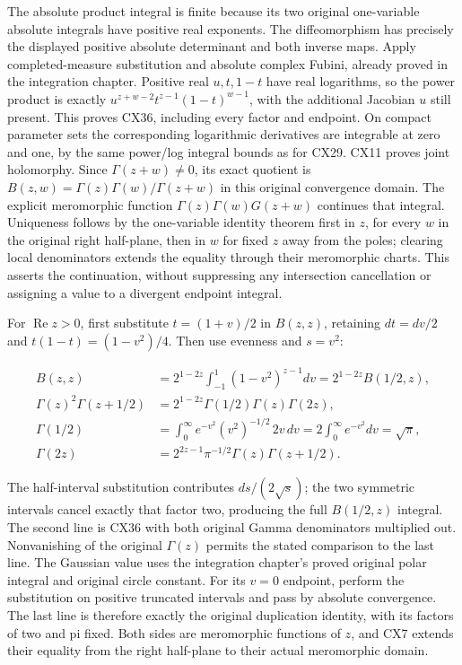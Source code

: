 \documentclass[
  11pt,
]{article}
\begin{document}
The absolute product integral is finite because its two original
one-variable absolute integrals have positive real exponents. The
diffeomorphism has precisely the displayed positive absolute determinant
and both inverse maps. Apply completed-measure substitution and absolute
complex Fubini, already proved in the integration chapter. Positive real
\(u,t,1-t\) have real logarithms, so the power product is exactly
\(u^{z+w-2}t^{z-1}(1-t)^{w-1}\), with the additional Jacobian \(u\)
still present. This proves CX36, including every factor and endpoint. On
compact parameter sets the corresponding logarithmic derivatives are
integrable at zero and one, by the same power/log integral bounds as for
CX29. CX11 proves joint holomorphy. Since \(\Gamma(z+w)\ne0\), its exact
quotient is \(B(z,w)=\Gamma(z)\Gamma(w)/\Gamma(z+w)\) in this original
convergence domain. The explicit meromorphic function
\(\Gamma(z)\Gamma(w)G(z+w)\) continues that integral. Uniqueness follows
by the one-variable identity theorem first in \(z\), for every \(w\) in
the original right half-plane, then in \(w\) for fixed \(z\) away from
the poles; clearing local denominators extends the equality through
their meromorphic charts. This asserts the continuation, without
suppressing any intersection cancellation or assigning a value to a
divergent endpoint integral.

For \(\operatorname{Re}z>0\), first substitute \(t=(1+v)/2\) in
\(B(z,z)\), retaining \(dt=dv/2\) and \(t(1-t)=(1-v^2)/4\). Then use
evenness and \(s=v^2\):

\[
\begin{aligned}
B(z,z)&=2^{1-2z}\int_{-1}^1(1-v^2)^{z-1}dv
       =2^{1-2z}B(1/2,z),\\
\Gamma(z)^2\Gamma(z+1/2)
       &=2^{1-2z}\Gamma(1/2)\Gamma(z)\Gamma(2z),\\
\Gamma(1/2)
       &=\int_0^\infty e^{-v^2}(v^2)^{-1/2}\,2v\,dv
         =2\int_0^\infty e^{-v^2}dv=\sqrt{\pi},\\
\Gamma(2z)&=2^{2z-1}\pi^{-1/2}\Gamma(z)\Gamma(z+1/2).
\end{aligned}
\tag{CX37}
\]

The half-interval substitution contributes \(ds/(2\sqrt s)\); the two
symmetric intervals cancel exactly that factor two, producing the full
\(B(1/2,z)\) integral. The second line is CX36 with both original Gamma
denominators multiplied out. Nonvanishing of the original \(\Gamma(z)\)
permits the stated comparison to the last line. The Gaussian value uses
the integration chapter's proved original polar integral and original
circle constant. For its \(v=0\) endpoint, perform the substitution on
positive truncated intervals and pass by absolute convergence. The last
line is therefore exactly the original duplication identity, with its
factors of two and pi fixed. Both sides are meromorphic functions of
\(z\), and CX7 extends their equality from the right half-plane to their
actual meromorphic domain.
\end{document}
